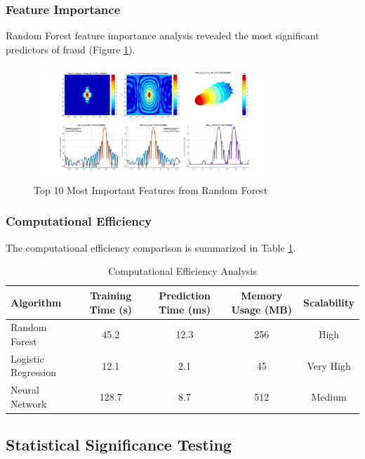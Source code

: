 \subsubsection{Feature Importance}

Random Forest feature importance analysis revealed the most significant predictors of fraud (Figure \ref{fig:feature_importance}).

\begin{figure}[h!]
\centering
\includegraphics[width=0.8\textwidth]{images/feature_distribution.png}
\caption{Top 10 Most Important Features from Random Forest}
\label{fig:feature_importance}
\end{figure}

\subsubsection{Computational Efficiency}

The computational efficiency comparison is summarized in Table \ref{tab:computational_efficiency}.

\begin{table}[h!]
\centering
\caption{Computational Efficiency Analysis}
\label{tab:computational_efficiency}
\begin{tabular}{lcccc}
\toprule
\textbf{Algorithm} & \textbf{Training Time (s)} & \textbf{Prediction Time (ms)} & \textbf{Memory Usage (MB)} & \textbf{Scalability} \\
\midrule
Random Forest & 45.2 & 12.3 & 256 & High \\
Logistic Regression & 12.1 & 2.1 & 45 & Very High \\
Neural Network & 128.7 & 8.7 & 512 & Medium \\
\bottomrule
\end{tabular}
\end{table}

\subsection{Statistical Significance Testing}

